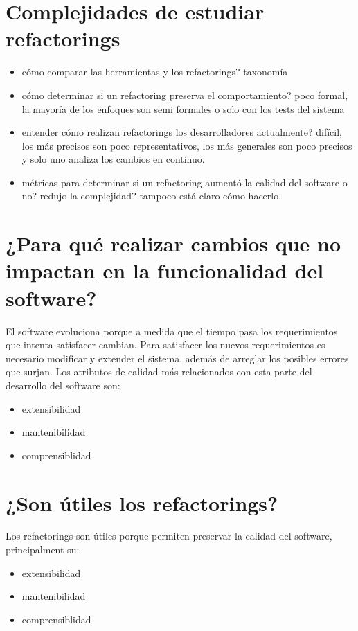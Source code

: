 \section{Complejidades de estudiar refactorings}

\begin{itemize}
    \item cómo comparar las herramientas y los refactorings? taxonomía
    \item cómo determinar si un refactoring preserva el comportamiento? poco formal, la mayoría de
    los enfoques son semi formales o solo con los tests del sistema
    \item entender cómo realizan refactorings los desarrolladores actualmente? difícil, los más
    precisos son poco representativos, los más generales son poco precisos y solo uno analiza los
    cambios en continuo.
    \item métricas para determinar si un refactoring aumentó la calidad del software o no? redujo la
    complejidad? tampoco está claro cómo hacerlo.
\end{itemize}


\section{¿Para qué realizar cambios que no impactan en la funcionalidad del software?}
El software evoluciona porque a medida que el tiempo pasa los requerimientos que intenta satisfacer
cambian. Para satisfacer los nuevos requerimientos es necesario modificar y extender el sistema,
además de arreglar los posibles errores que surjan. Los atributos de calidad más relacionados con
esta parte del desarrollo del software son: 

\begin{itemize}
    \item extensibilidad
    \item mantenibilidad
    \item comprensiblidad
\end{itemize}


\section{¿Son útiles los refactorings?}
Los refactorings son útiles porque permiten preservar la calidad del software, principalment su:

\begin{itemize}
    \item extensibilidad
    \item mantenibilidad
    \item comprensiblidad
\end{itemize}

